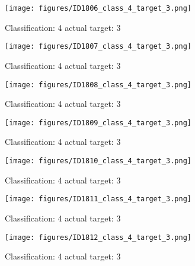 \begin{figure}[h!]
\begin{center}
\texttt{[image: figures/ID1806\_class\_4\_target\_3.png]}
\end{center}
\caption{ Classification: 4 actual target: 3}
\label{fig:ID1806_class_4_target_3}
\end{figure}
\begin{figure}[h!]
\begin{center}
\texttt{[image: figures/ID1807\_class\_4\_target\_3.png]}
\end{center}
\caption{ Classification: 4 actual target: 3}
\label{fig:ID1807_class_4_target_3}
\end{figure}
\begin{figure}[h!]
\begin{center}
\texttt{[image: figures/ID1808\_class\_4\_target\_3.png]}
\end{center}
\caption{ Classification: 4 actual target: 3}
\label{fig:ID1808_class_4_target_3}
\end{figure}
\begin{figure}[h!]
\begin{center}
\texttt{[image: figures/ID1809\_class\_4\_target\_3.png]}
\end{center}
\caption{ Classification: 4 actual target: 3}
\label{fig:ID1809_class_4_target_3}
\end{figure}
\begin{figure}[h!]
\begin{center}
\texttt{[image: figures/ID1810\_class\_4\_target\_3.png]}
\end{center}
\caption{ Classification: 4 actual target: 3}
\label{fig:ID1810_class_4_target_3}
\end{figure}
\begin{figure}[h!]
\begin{center}
\texttt{[image: figures/ID1811\_class\_4\_target\_3.png]}
\end{center}
\caption{ Classification: 4 actual target: 3}
\label{fig:ID1811_class_4_target_3}
\end{figure}
\begin{figure}[h!]
\begin{center}
\texttt{[image: figures/ID1812\_class\_4\_target\_3.png]}
\end{center}
\caption{ Classification: 4 actual target: 3}
\label{fig:ID1812_class_4_target_3}
\end{figure}
